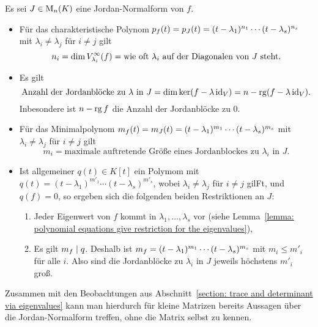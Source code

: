 Es sei $J \in \matrices{n}{K}$ eine Jordan-Normalform von $f$.
\begin{itemize}
  \item
    Für das charakteristische Polynom $\charpol{f}(t) = \charpol{J}(t) = (t - \lambda_1)^{n_1} \dotsm (t - \lambda_s)^{n_s}$ mit $\lambda_i \neq \lambda_j$ für $i \neq j$ gilt
    \[
        n_i
      = \dim \geigenspace{V}{f}{\lambda_i}
      = \text{wie oft $\lambda_i$ auf der Diagonalen von $J$ steht}.
    \]
  \item
    Es gilt
    \[
        \text{Anzahl der Jordanblöcke zu $\lambda$ in $J$}
      = \dim \ker (f - \lambda \id_V)
      = n - \rank (f - \lambda \id_V).
    \]
    Inbesondere ist $n - \rank f$ die Anzahl der Jordanblöcke zu $0$.
  \item
    Für das Minimalpolynom $\minpol{f}(t) = \minpol{J}(t) = (t - \lambda_1)^{m_1} \dotsm (t - \lambda_s)^{m_s}$ mit $\lambda_i \neq \lambda_j$ für $i \neq j$ gilt
    \[
        m_i
      = \text{maximale auftretende Größe eines Jordanblockes zu $\lambda_i$ in $J$}.
    \]
  \item
    Ist allgemeiner $q(t) \in K[t]$ ein Polymom mit $q(t) = (t - \lambda_1)^{m'_1} \dotsm (t - \lambda_s)^{m'_s}$, wobei $\lambda_i \neq \lambda_j$ für $i \neq j$ gilFt, und $q(f) = 0$, so ergeben sich die folgenden beiden Restriktionen an $J$:
    \begin{enumerate}
      \item
        Jeder Eigenwert von $f$ kommt in $\lambda_1, \dotsc, \lambda_s$ vor (siehe Lemma~\ref{lemma: polynomial equations give restriction for the eigenvalues}),
      \item
        Es gilt $\minpol{f} \divides q$.
        Deshalb ist $\minpol{f} = (t - \lambda_1)^{m_1} \dotsm (t - \lambda_s)^{m_s}$ mit $m_i \leq m'_i$ für alle $i$.
        Also sind die Jordanblöcke zu $\lambda_i$ in $J$ jeweils höchstens $m'_i$ groß.
    \end{enumerate}
\end{itemize}

Zusammen mit den Beobachtungen aus Abschnitt~\ref{section: trace and determinant via eigenvalues} kann man hierdurch für kleine Matrizen bereits Aussagen über die Jordan-Nor\-mal\-form treffen, ohne die Matrix selbst zu kennen.

